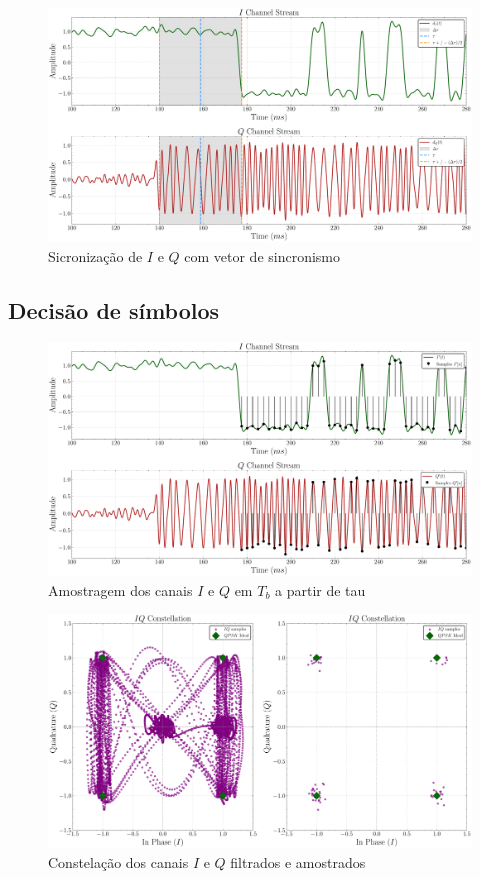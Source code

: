\begin{figure}[H]
	\centering
	\caption{Sicronização de $I$ e $Q$ com vetor de sincronismo}\label{fig:receiver_sync}
	\includegraphics[width=\linewidth]{assets/cap3/receiver_sync_time.pdf}
\end{figure}


\subsection{Decisão de símbolos}\label{sec:decisao_simbolos}

\begin{figure}[H]
	\centering
	\caption{Amostragem dos canais $I$ e $Q$ em $T_b$ a partir de \gls{tau}}\label{fig:receiver_sampler}
	\includegraphics[width=\linewidth]{assets/cap3/receiver_sampler_time.pdf}
\end{figure}

\begin{figure}[H]
	\centering
	\caption{Constelação dos canais $I$ e $Q$ filtrados e amostrados}\label{fig:receiver_const}
	\includegraphics[width=\linewidth]{assets/cap3/receiver_sampler_const.pdf}
\end{figure}

